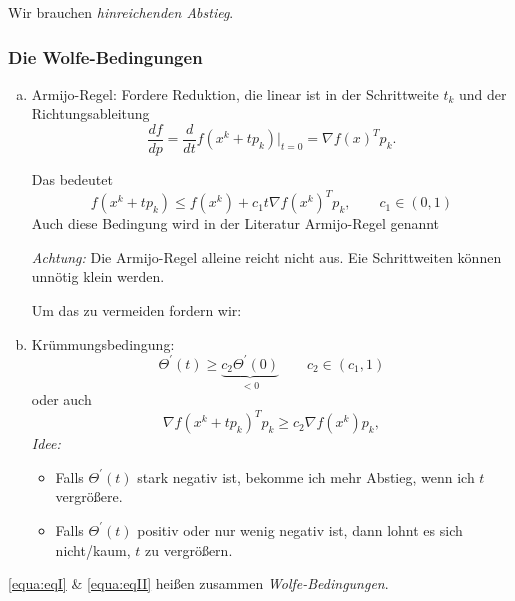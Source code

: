 Wir brauchen \emph{hinreichenden Abstieg}.

\subsubsection{Die Wolfe-Bedingungen}

\begin{enumerate}[a)]
 \item Armijo-Regel: Fordere Reduktion, die linear ist in der Schrittweite $t_k$ und der Richtungsableitung
  \begin{equation*}
   \dfrac{df}{dp} = \dfrac{d}{dt}f (x^k+tp_k ) \bigg|_{t=0}=\nabla f(x)^Tp_k.
  \end{equation*}

  Das bedeutet
  \begin{equation}
   \label{equa:eqI}
   f (x^k+tp_k ) \leq f (x^k )+c_1t \nabla f (x^k )^Tp_k, \qquad c_1 \in (0,1)
  \end{equation}
  Auch diese Bedingung wird in der Literatur Armijo-Regel genannt 


  \emph{Achtung:} Die Armijo-Regel alleine reicht nicht aus. Eie Schrittweiten können unnötig klein werden.

  Um das zu vermeiden fordern wir:

 \item Krümmungsbedingung:
  \begin{equation*}
   \Theta^{\prime}(t) \geq \underbrace{c_2 \Theta^{\prime}(0)}_{<0}
   \qquad
   c_2 \in (c_1,1)
  \end{equation*}
  oder auch
  \begin{equation}
   \label{equa:eqII}
   \nabla f(x^k+tp_k)^T p_k \geq c_2 \nabla f (x^k ) p_k,
  \end{equation}
  \emph{Idee:}
  \begin{itemize}
   \item Falls $\Theta^{\prime}(t)$ stark negativ ist, bekomme ich mehr Abstieg, wenn ich $t$ vergrößere.
   \item Falls $\Theta^{\prime}(t)$ positiv oder nur wenig negativ ist, dann lohnt es sich nicht/kaum, $t$ zu vergrößern.
  \end{itemize}
\end{enumerate}

\eqref{equa:eqI} \& \eqref{equa:eqII} heißen zusammen \emph{Wolfe-Bedingungen}.

